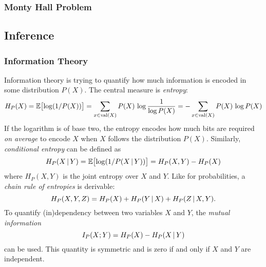             \subsubsection{Monty Hall Problem} %

        \subsection{Inference} %

            \subsubsection{Information Theory}
                Information theory is trying to quantify how much information is encoded in some distribution \(P(X)\). The central measure is \emph{entropy}:
                \begin{equation}
                	H_P(X)
                		= \mathbb{E}\bigl[ \log(1/P(X)) \bigr]
                		= \sum_{x \in \operatorname{val}(X)} P(X) \,\log \frac{1}{\log P(X)}
                		= -\sum_{x \in \operatorname{val}(X)} P(X) \,\log P(X)
                \end{equation}
                If the logarithm is of base two, the entropy encodes how much bits are required \emph{on average} to encode \(X\) when \(X\) follows the distribution \(P(X)\). Similarly, \emph{conditional entropy} can be defined as
                \begin{equation}
                	H_P(X \,\vert\, Y)
                		= \mathbb{E}\bigl[ \log(1/P(X \,\vert\, Y)) \bigr]
                		= H_P(X, Y) - H_P(X)
                \end{equation}
                where \( H_P(X, Y) \) is the joint entropy over \(X\) and \(Y\). Like for probabilities, a \emph{chain rule of entropies} is derivable:
                \begin{equation}
                	H_P(X, Y, Z) = H_P(X) + H_P(Y \,\vert\, X) + H_P(Z \,\vert\, X, Y).
                \end{equation}
                To quantify (in)dependency between two variables \(X\) and \(Y\), the \emph{mutual information}
                \begin{equation}
                	I_P(X; Y) = H_P(X) - H_P(X \,\vert\, Y)
                \end{equation}
                can be used. This quantity is symmetric and is zero if and only if \(X\) and \(Y\) are independent.

